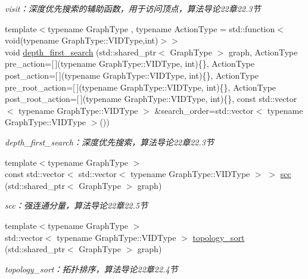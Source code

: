 \begin{DoxyCompactItemize}
\begin{DoxyCompactList}\small\item\em visit：深度优先搜索的辅助函数，用于访问顶点，算法导论22章22.3节 \end{DoxyCompactList}\item 
{\footnotesize template$<$typename Graph\+Type , typename Action\+Type  = std\+::function$<$void(typename Graph\+Type\+::\+V\+I\+D\+Type,int)$>$$>$ }\\void \hyperlink{namespace_introduction_to_algorithm_1_1_graph_algorithm_a3bb9faf89f84f73b716c25966786e078}{depth\+\_\+first\+\_\+search} (std\+::shared\+\_\+ptr$<$ Graph\+Type $>$ graph, Action\+Type pre\+\_\+action=\mbox{[}$\,$\mbox{]}(typename Graph\+Type\+::\+V\+I\+D\+Type, int)\{\}, Action\+Type post\+\_\+action=\mbox{[}$\,$\mbox{]}(typename Graph\+Type\+::\+V\+I\+D\+Type, int)\{\}, Action\+Type pre\+\_\+root\+\_\+action=\mbox{[}$\,$\mbox{]}(typename Graph\+Type\+::\+V\+I\+D\+Type, int)\{\}, Action\+Type post\+\_\+root\+\_\+action=\mbox{[}$\,$\mbox{]}(typename Graph\+Type\+::\+V\+I\+D\+Type, int)\{\}, const std\+::vector$<$ typename Graph\+Type\+::\+V\+I\+D\+Type $>$ \&search\+\_\+order=std\+::vector$<$ typename Graph\+Type\+::\+V\+I\+D\+Type $>$())
\begin{DoxyCompactList}\small\item\em depth\+\_\+first\+\_\+search：深度优先搜索，算法导论22章22.3节 \end{DoxyCompactList}\item 
{\footnotesize template$<$typename Graph\+Type $>$ }\\const std\+::vector$<$ std\+::vector$<$ typename Graph\+Type\+::\+V\+I\+D\+Type $>$ $>$ \hyperlink{namespace_introduction_to_algorithm_1_1_graph_algorithm_a6d058c2aaa8714778b3f2ab8a24ff232}{scc} (std\+::shared\+\_\+ptr$<$ Graph\+Type $>$ graph)
\begin{DoxyCompactList}\small\item\em scc：强连通分量，算法导论22章22.5节 \end{DoxyCompactList}\item 
{\footnotesize template$<$typename Graph\+Type $>$ }\\std\+::vector$<$ typename Graph\+Type\+::\+V\+I\+D\+Type $>$ \hyperlink{namespace_introduction_to_algorithm_1_1_graph_algorithm_a804241e72be5f4c031190bc12a6b73a2}{topology\+\_\+sort} (std\+::shared\+\_\+ptr$<$ Graph\+Type $>$ graph)
\begin{DoxyCompactList}\small\item\em topology\+\_\+sort：拓扑排序，算法导论22章22.4节 \end{DoxyCompactList}\item 

\end{DoxyCompactItemize}
